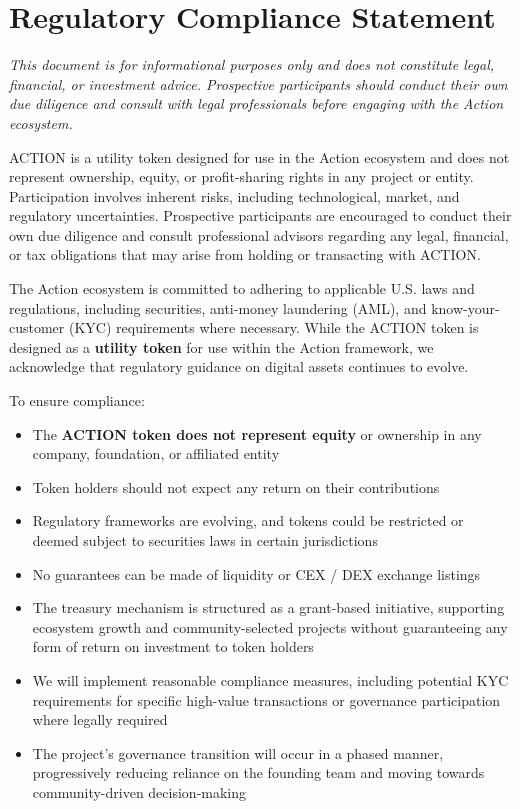\section{Regulatory Compliance Statement}

\emph{This document is for informational purposes only and does not constitute legal, financial, or investment advice. Prospective participants should conduct their own due diligence and consult with legal professionals before engaging with the Action ecosystem.}


\vspace{1em}  

ACTION is a utility token designed for use in the Action ecosystem and does not represent ownership, equity, or profit-sharing rights in any project or entity. Participation involves inherent risks, including technological, market, and regulatory uncertainties. Prospective participants are encouraged to conduct their own due diligence and consult professional advisors regarding any legal, financial, or tax obligations that may arise from holding or transacting with ACTION.

The Action ecosystem is committed to adhering to applicable U.S. laws and regulations, including securities, anti-money laundering (AML), and know-your-customer (KYC) requirements where necessary. While the ACTION token is designed as a \textbf{utility token} for use within the Action framework, we acknowledge that regulatory guidance on digital assets continues to evolve.

To ensure compliance:
\begin{itemize}
\item The \textbf{ACTION token does not represent equity} or ownership in any company, foundation, or affiliated entity
\item Token holders should not expect any return on their contributions
\item Regulatory frameworks are evolving, and tokens could be restricted or deemed subject to securities laws in certain jurisdictions
\item No guarantees can be made of liquidity or CEX / DEX exchange listings
\item The treasury mechanism is structured as a grant-based initiative, supporting ecosystem growth and community-selected projects without guaranteeing any form of return on investment to token holders
\item We will implement reasonable compliance measures, including potential KYC requirements for specific high-value transactions or governance participation where legally required
\item The project's governance transition will occur in a phased manner, progressively reducing reliance on the founding team and moving towards community-driven decision-making
\end{itemize}
